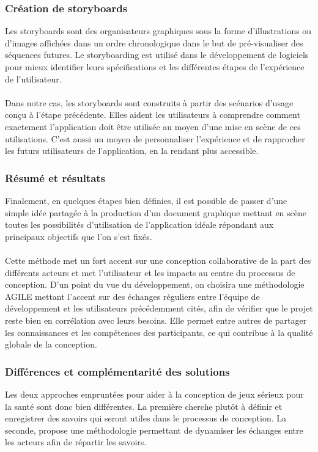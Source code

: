 	
	\subsubsection*{Création de storyboards}
Les storyboards sont des organisateurs graphiques sous la forme d'illustrations ou d'images affichées dans un ordre chronologique dans le but de pré-visualiser des séquences futures. Le storyboarding est utilisé dans le développement de logiciels pour mieux identifier leurs spécifications et les différentes étapes de l'expérience de l'utilisateur.
\paragraph{}
Dans notre cas, les storyboards sont construits à partir des scénarios d'usage conçu à l'étape précédente. Elles aident les utilisateurs à comprendre comment exactement l'application doit être utilisée au moyen d'une mise en scène de ces utilisations. C'est aussi un moyen de personnaliser l'expérience et de rapprocher les futurs utilisateurs de l'application, en la rendant plus accessible.
	
	\subsubsection*{Résumé et résultats}	 
Finalement, en quelques étapes bien définies, il est possible de passer d'une simple idée partagée à la production d'un document graphique mettant en scène toutes les possibilités d'utilisation de l'application idéale répondant aux principaux objectifs que l'on s'est fixés.

\paragraph{} Cette méthode met un fort accent sur une conception collaborative de la part des différents acteurs et met l'utilisateur et les impacts au centre du processus de conception. D'un point du vue du développement, on choisira une méthodologie AGILE mettant l'accent sur des échanges réguliers entre l'équipe de développement et les utilisateurs précédemment cités, afin de vérifier que le projet reste bien en corrélation avec leurs besoins. Elle permet entre autres de partager les connaissances et les compétences des participants, ce qui contribue à la qualité globale de la conception.

	\subsubsection{Différences et complémentarité des solutions}
Les deux approches empruntées pour aider à la conception de jeux sérieux pour la santé sont donc bien différentes. La première cherche plutôt à définir et enregistrer des savoirs qui seront utiles dans le processus de conception. La seconde, propose une méthodologie permettant de dynamiser les échanges entre les acteurs afin de répartir les savoirs.

